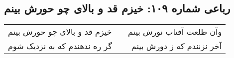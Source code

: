 \begin{center}
\section*{رباعی شماره ۱۰۹: خیزم قد و بالای چو حورش بینم}
\label{sec:109}
\begin{longtable}{l p{0.5cm} r}
خیزم قد و بالای چو حورش بینم
&&
وآن طلعت آفتاب نورش بینم
\\
گر ره ندهندم که به نزدیک شوم
&&
آخر نزنندم که ز دورش بینم
\\
\end{longtable}
\end{center}
